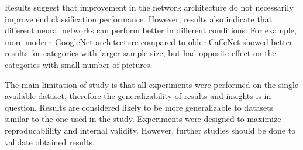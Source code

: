 Results suggest that improvement in the network architecture do not necessarily improve end classification performance. However, results also indicate that different neural networks can perform better in different conditions. For example, more modern GoogleNet architecture compared to older CaffeNet showed better results for categories with larger sample size, but had opposite effect on the categories with small number of pictures.




The main limitation of study is that all experiments were performed on the single available dataset, therefore the generalizability of results and insights is in question. Results are considered likely to be more generalizable to datasets similar to the one used in the study. Experiments were designed to maximize reproducablility and internal validity. However, further studies should be done to validate obtained results.
